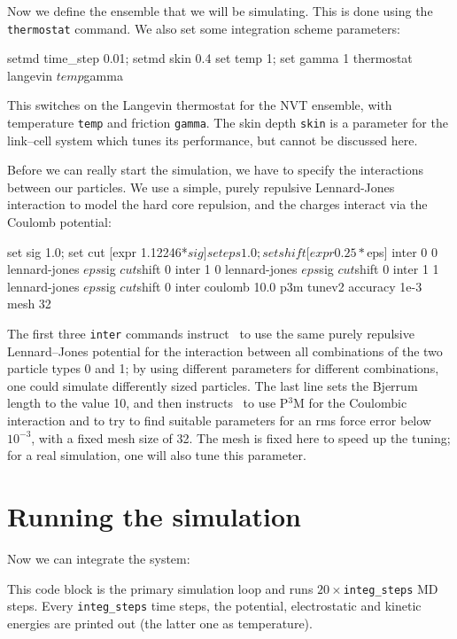 \documentclass[
a4paper,                        %
11pt,                           %
twoside,                        %
footsepline,                    %
headsepline,                    %
headexclude,                    %
footexclude,                    %
pagesize,                       %
]{scrreprt}
\begin{document}
Now we define the ensemble that we will be simulating. This is done
using the \verb|thermostat| command. We also set some integration
scheme parameters:
\begin{tclcode}
  setmd time_step 0.01; setmd skin 0.4 set temp 1; set gamma 1
  thermostat langevin $temp $gamma
\end{tclcode}
This switches on the Langevin thermostat for the NVT ensemble, with
temperature \verb|temp| and friction \verb|gamma|. The skin depth
\verb|skin| is a parameter for the link--cell system which tunes its
performance, but cannot be discussed here.

Before we can really start the simulation, we have to specify the
interactions between our particles.  We use a simple, purely repulsive
Lennard-Jones interaction to model the hard core repulsion, and the
charges interact via the Coulomb potential:
\begin{tclcode}
  set sig 1.0; set cut [expr 1.12246*$sig] set eps 1.0; set shift
  [expr 0.25*$eps] inter 0 0 lennard-jones $eps $sig $cut $shift 0
  inter 1 0 lennard-jones $eps $sig $cut $shift 0 inter 1 1
  lennard-jones $eps $sig $cut $shift 0 inter coulomb 10.0 p3m tunev2
  accuracy 1e-3 mesh 32
\end{tclcode}
The first three \verb|inter| commands instruct \es\ to use the same
purely repulsive Lennard--Jones potential for the interaction between
all combinations of the two particle types 0 and 1; by using different
parameters for different combinations, one could simulate differently
sized particles.  The last line sets the Bjerrum length to the value
10, and then instructs \es\ to use P$^3$M for the Coulombic
interaction and to try to find suitable parameters for an rms force
error below $10^{-3}$, with a fixed mesh size of 32. The mesh is fixed
here to speed up the tuning; for a real simulation, one will also tune
this parameter.

\section{Running the simulation}

Now we can integrate the system:
This code block is the primary simulation loop and runs
$20\times$\verb|integ_steps| MD steps. Every \verb|integ_steps| time
steps, the potential, electrostatic and kinetic energies are printed
out (the latter one as temperature).
\end{document}
